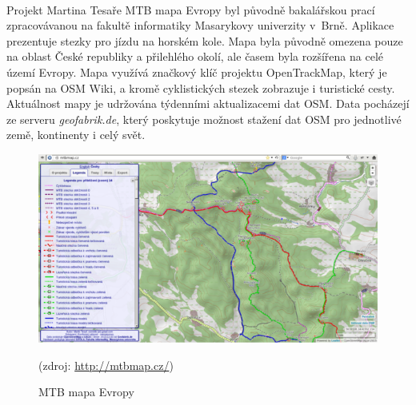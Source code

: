 \documentclass[11pt,a4paper,titlepage,oneside]{book}
\begin{document}
		\paragraph{} Projekt Martina Tesaře MTB mapa Evropy byl původně bakalářskou prací zpracovávanou na fakultě informatiky Masarykovy univerzity v~Brně. Aplikace prezentuje stezky pro jízdu na horském kole. Mapa byla původně omezena pouze na oblast České republiky a přilehlého okolí, ale časem byla rozšířena na celé území Evropy. Mapa využívá značkový klíč projektu OpenTrackMap, který je popsán na \ac{OSM} Wiki\cite{otm_klic}, a kromě cyklistických stezek zobrazuje i turistické cesty. Aktuálnost mapy je udržována týdenními aktualizacemi dat \ac{OSM}. Data pocházejí ze serveru \textit{geofabrik.de}, který poskytuje možnost stažení dat \ac{OSM} pro jednotlivé země, kontinenty i celý svět.






		\begin{figure}[!h]
			\begin{center}
				\includegraphics[width=12cm]{obrazky/mtb.png}
				\caption{MTB mapa Evropy}
				(zdroj: \url{http://mtbmap.cz/})
			\end{center}
		\end{figure}
\end{document}
